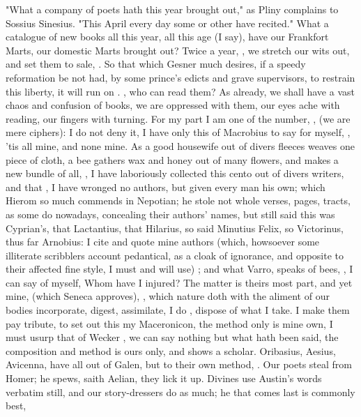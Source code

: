 "What a company of poets hath this year brought out," as Pliny complains to
Sossius Sinesius. "This April every day some or other have
recited." What a catalogue of new books all this year, all this age (I say),
have our Frankfort Marts, our domestic Marts brought out? Twice a year,
, we stretch our
wits out, and set them to sale, . So that which
Gesner much desires, if a speedy reformation be not had, by
some prince's edicts and grave supervisors, to restrain this liberty, it will
run on . , who can read
them? As already, we shall have a vast chaos and confusion of books, we are
oppressed with them, our eyes ache with
reading, our fingers with turning. For my part I am one of the number, , (we are mere ciphers): I do not deny it, I have only this of
Macrobius to say for myself, , 'tis all mine, and
none mine. As a good housewife out of divers fleeces weaves one piece of cloth,
a bee gathers wax and honey out of many flowers, and makes a new bundle of all,
, I have laboriously
collected this cento out of divers writers, and that
, I have wronged no authors, but given every man his own;
which Hierom so much commends in Nepotian; he stole not
whole verses, pages, tracts, as some do nowadays, concealing their authors'
names, but still said this was Cyprian's, that Lactantius, that Hilarius, so
said Minutius Felix, so Victorinus, thus far Arnobius: I cite and quote mine
authors (which, howsoever some illiterate scribblers account pedantical, as a
cloak of ignorance, and opposite to their affected fine style, I must and will
use) ; and what Varro,  speaks of bees, , I can say of myself, Whom have I injured? The matter is
theirs most part, and yet mine,  (which Seneca
approves), , which nature doth
with the aliment of our bodies incorporate, digest, assimilate, I do
, dispose of what I take. I make them pay tribute, to
set out this my Maceronicon, the method only is mine own, I must usurp that of
Wecker , we can say nothing but what hath been said,
the composition and method is ours only, and shows a scholar. Oribasius,
Aesius, Avicenna, have all out of Galen, but to their own method, . Our poets steal from Homer; he spews, saith Aelian,
they lick it up. Divines use Austin's words verbatim still, and our
story-dressers do as much; he that comes last is commonly best,

